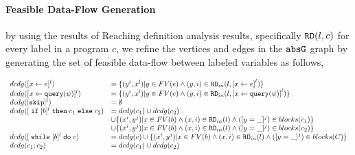 \paragraph{Feasible Data-Flow Generation}
by using the results of Reaching definition analysis results, specifically $\mathtt{RD}(l, c)$ for every label in a program $c$, we refine the vertices and edges in the $\mathtt{abs}{\mathtt{G}}$ graph 
by generating the set of feasible data-flow between labeled variables as follows,
%
%
 \begin{defn}
  \label{def:feasible_flowsto}
    {\footnotesize
    \[
   \begin{array}{ll}
      dcdg(\clabel{\assign{x}{\expr}}{}^l)  & = \{ (y^i, x^l) | y \in FV(e) \land (y,i) \in \live_{in}(l, \clabel{\assign{x}{\expr}}^l) \}  \\
       dcdg(\clabel{\assign{x}{\query(\qexpr)}}{}^l)  & = \{ (y^i, x^l) | y \in FV(e) \land (y,i) \in \live_{in}(l,\clabel{\assign{x}{\query(\qexpr)}}^l) \}  \\
       dcdg([\eskip]^{l})  & = \emptyset \\
       dcdg([\eif [b]^l \ethen c_1 \eelse c_2)  & =  dcdg(c_1) \cup dcdg(c_2)\\ & \cup 
       \{(x^i,y^j) | x \in FV(b) \land (x,i) \in \live_{in}(l) \land ([y = \_]^j) \in blocks(c_1) \} \\
       &\cup \{(x^i,y^j) | x \in FV(b) \land (x,i) \in \live_{in}(l) \land ([y = \_]^j) \in blocks(c_2) \} \\
       dcdg([\ewhile [b]^l \edo c)  & =  dcdg(c) \cup \{(x^i,y^j) | x \in FV(b) \land (x,i) \in \live_{in}(l) \land ([y = \_]^j) \in blocks(C) \} \\
       dcdg(c_1 ;c_2)  & = dcdg(c_1) \cup  dcdg(c_2) \\
   \end{array}
   \]
   }
   \end{defn}
